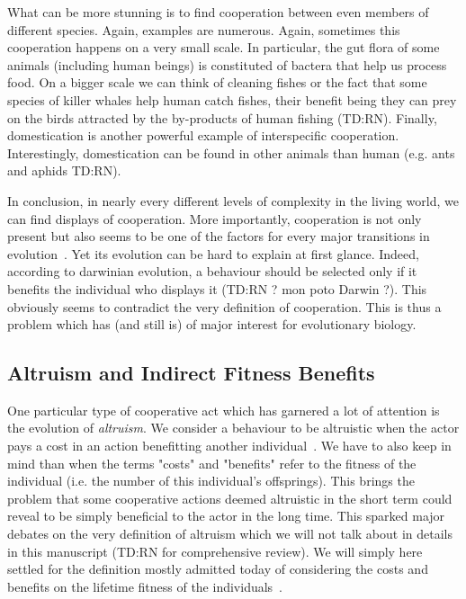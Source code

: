     What can be more stunning is to find cooperation between even members of different species. Again, examples are numerous. Again, sometimes this cooperation happens on a very small scale. In particular, the gut flora of some animals (including human beings) is constituted of bactera that help us process food. On a bigger scale we can think of cleaning fishes or the fact that some species of killer whales help human catch fishes, their benefit being they can prey on the birds attracted by the by-products of human fishing (TD:RN). Finally, domestication is another powerful example of interspecific cooperation. Interestingly, domestication can be found in other animals than human (e.g. ants and aphids TD:RN).

    In conclusion, in nearly every different levels of complexity in the living world, we can find displays of cooperation. More importantly, cooperation is not only present but also seems to be one of the factors for every major transitions in evolution~\parencite{Szathmary1995}. Yet its evolution can be hard to explain at first glance. Indeed, according to darwinian evolution, a behaviour should be selected only if it benefits the individual who displays it (TD:RN ? mon poto Darwin ?). This obviously seems to contradict the very definition of cooperation. This is thus a problem which has (and still is) of major interest for evolutionary biology.



  \subsection{Altruism and Indirect Fitness Benefits}

    One particular type of cooperative act which has garnered a lot of attention is the evolution of \emph{altruism}. We consider a behaviour to be altruistic when the actor pays a cost in an action benefitting another individual~\parencite{Hamilton1964, West2007a}. We have to also keep in mind than when the terms "costs" and "benefits" refer to the fitness of the individual (i.e. the number of this individual's offsprings). This brings the problem that some cooperative actions deemed altruistic in the short term could reveal to be simply beneficial to the actor in the long time. This sparked major debates on the very definition of altruism which we will not talk about in details in this manuscript (TD:RN for comprehensive review). We will simply here settled for the definition mostly admitted today of considering the costs and benefits on the lifetime fitness of the individuals~\parencite{West2007a, Lehmann2006}.

